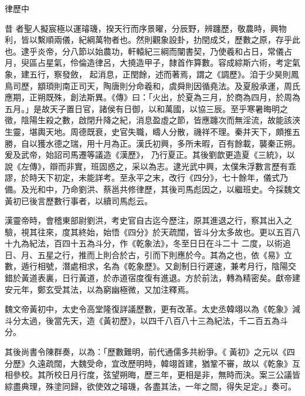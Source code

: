 
\begin{pinyinscope}

 律歷中



 昔
 者聖人擬宸極以運璿璣，揆天行而序景曜，分辰野，辨躔歷，敬農時，興物利，皆以繫順兩儀，紀綱萬物者也。然則觀象設卦，扐閏成爻，歷數之原，存乎此也。逮乎炎帝，分八節以始農功，軒轅紀三綱而闡書契，乃使羲和占日，常儀占月，臾區占星氣，伶倫造律呂，大撓造甲子，隸首作算數。容成綜斯六術，考定氣象，建五行，察發斂，
 起消息，正閏餘，述而著焉，謂之《調歷》。洎于少昊則鳳鳥司歷，顓頊則南正司天，陶唐則分命羲和，虞舜則因循堯法。及夏殷承運，周氏應期，正朔既殊，創法斯異。《傳》曰：「火出，於夏為三月，於商為四月，於周為五月。」是故天子置日官，諸侯有日御，以和萬國，以協三辰。至乎寒暑晦明之徵，陰陽生殺之數，啟閉升降之紀，消息盈虛之節，皆應躔次而無淫流，故能該浹生靈，堪輿天地。周德既衰，史官失職，疇人分散，禨祥不理。秦并天下，頗推五勝，自以獲水德之瑞，用十月為正。漢氏初興，多所未暇，百有餘載，襲秦正朔。爰及武帝，始詔司馬遷等議造《漢歷》，
 乃行夏正。其後劉歆更造夏《三統》，以說《左傳》，辯而非實，班固惑之，采以為志。逮光武中興，太僕朱浮數言歷有乖謬，於時天下初定，未能詳考。至永平之末，改行《四分》，七十餘年，儀式乃備。及光和中，乃命劉洪、蔡邕共修律歷，其後司馬彪因之，以繼班史。今採魏文黃初已後言歷數行事者，以續司馬彪云。



 漢靈帝時，會稽東部尉劉洪，考史官自古迄今歷注，原其進退之行，察其出入之驗，視其往來，度其終始，始悟《四分》於天疏闊，皆斗分太多故也。更以五百八十九為紀法，百四十五為斗分，作《乾象法》，冬至日日在斗二十
 二度，以術追日、月、五星之行，推而上則合於古，引而下則應於今。其為之也，依《易》立數，遁行相號，潛處相求，名為《乾象歷》。又創制日行遲速，兼考月行，陰陽交錯於黃道表裏，日行黃道，於赤道宿度復有進退。方於前法，轉為精密矣。獻帝建安元年，鄭玄受其法，以為窮幽極微，又加注釋焉。



 魏文帝黃初中，太史令高堂隆復詳議歷數，更有改革。太史丞韓翊以為《乾象》減斗分太過，後當先天，造《黃初歷》，以四千八百八十三為紀法，千二百五為斗分。



 其後尚書令陳群奏，以為：「歷數難明，前代通儒多共紛爭。《
 黃初》之元以《四分歷》久遠疏闊，大魏受命，宜改歷明時，韓翊首建，猶鞏不審，故以《乾象》互相參校。其所校日月行度，弦望朔晦，歷三年，更相是非，無時而決。案三公議皆綜盡典理，殊塗同歸，欲使效之璿璣，各盡其法，一年之間，得失足定。」奏可。




\end{pinyinscope}
